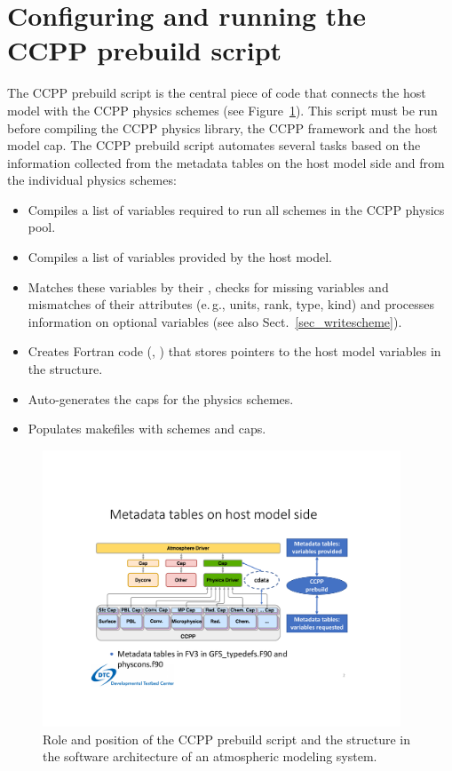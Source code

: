 \section{Configuring and running the CCPP prebuild script}
\label{sec_ccpp_prebuild_config}
The CCPP prebuild script  is the central piece of code that connects the host model with the CCPP physics schemes (see Figure~\ref{fig_ccpp_design_with_ccpp_prebuild}). This script must be run before compiling the CCPP physics library, the CCPP framework and the host model cap. The CCPP prebuild script automates several tasks based on the information collected from the metadata tables on the host model side and from the individual physics schemes:
\begin{itemize}
\item Compiles a list of variables required to run all schemes in the CCPP physics pool.
\item Compiles a list of variables provided by the host model.
\item Matches these variables by their , checks for missing variables and mismatches of their attributes (e.\,g., units, rank, type, kind) and processes information on optional variables (see also Sect.~\ref{sec_writescheme}).
\item Creates Fortran code (, ) that stores pointers to the host model variables in the  structure.
\item Auto-generates the caps for the physics schemes.
\item Populates makefiles with schemes and caps.
\end{itemize}
\begin{figure}[h]
\centerline{\includegraphics[width=0.95\textwidth]{./images/ccpp_design_with_ccpp_prebuild.pdf}}
\caption{Role and position of the CCPP prebuild script and the  structure in the software architecture of an atmospheric modeling system.}\label{fig_ccpp_design_with_ccpp_prebuild}
\end{figure}

